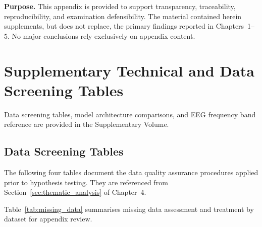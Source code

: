 


\noindent\textbf{Purpose.} This appendix is provided to support transparency, traceability, reproducibility, and examination defensibility. The material contained herein supplements, but does not replace, the primary findings reported in Chapters~1--5. No major conclusions rely exclusively on appendix content.

\section{Supplementary Technical and Data Screening Tables}
\label{app:supplementary_tables}

Data screening tables, model architecture comparisons, and EEG frequency band reference are provided in the Supplementary Volume.

\iffalse

\subsection{Data Screening Tables}

The following four tables document the data quality assurance procedures
applied prior to hypothesis testing. They are referenced from
Section~\ref{sec:thematic_analysis} of Chapter~4.

\noindent Table~\ref{tab:missing_data} summarises missing data assessment and treatment by dataset for appendix review.

